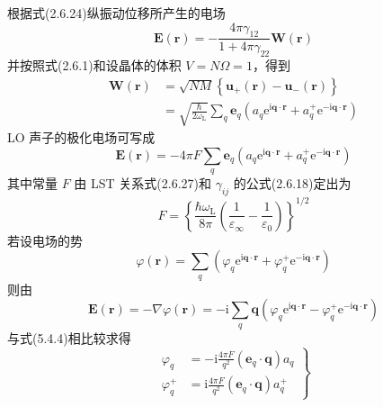 根据式(2.6.24)纵振动位移所产生的电场
\begin{equation}
  \boldsymbol{E}\left(\boldsymbol{r}\right)=-\frac{4\pi\gamma_{12}}{1+4\pi\gamma_{22}}\boldsymbol{W}\left(\boldsymbol{r}\right)
\end{equation}
并按照式(2.6.1)和设晶体的体积 $V=N\Omega=1$，得到
\begin{equation}
\begin{aligned}
  \boldsymbol{W}\left(\boldsymbol{r}\right)&=\sqrt{NM}\left\{\boldsymbol{u}_{+}\left(\boldsymbol{r}\right)
  -\boldsymbol{u}_{-}\left(\boldsymbol{r}\right)\right\}\\
  &=\sqrt{\frac{\hbar}{2\omega_{\mathrm{L}}}}\sum_{q}\boldsymbol{e}_q
  \left(a_q\mathrm{e}^{\mathrm{i}\boldsymbol{q}\cdot\boldsymbol{r}}+a_q^{+}\mathrm{e}^{-\mathrm{i}\boldsymbol{q}\cdot\boldsymbol{r}}\right)
\end{aligned}
\end{equation}
LO 声子的极化电场可写成
\begin{equation}
  \boldsymbol{E}\left(\boldsymbol{r}\right)=-4\pi F\sum_{q}\boldsymbol{e}_q
  \left(a_q\mathrm{e}^{\mathrm{i}\boldsymbol{q}\cdot\boldsymbol{r}}+a_q^{+}\mathrm{e}^{-\mathrm{i}\boldsymbol{q}\cdot\boldsymbol{r}}\right)
\end{equation}
其中常量 $F$ 由 LST 关系式(2.6.27)和 $\gamma_{ij}$ 的公式(2.6.18)定出为
\begin{equation}
  F=\left\{\frac{\hbar\omega_{\mathrm{L}}}{8\pi}\left(\frac{1}{\varepsilon_{\infty}}-\frac{1}{\varepsilon_0}\right)\right\}^{1/2}
\end{equation}
若设电场的势
\begin{equation}
  \varphi\left(\boldsymbol{r}\right)=\sum_{q}\left(\varphi_q\mathrm{e}^{\mathrm{i}\boldsymbol{q}\cdot\boldsymbol{r}}
  +\varphi_q^{+}\mathrm{e}^{-\mathrm{i}\boldsymbol{q}\cdot\boldsymbol{r}}\right)
\end{equation}
则由
\begin{equation}
  \boldsymbol{E}\left(\boldsymbol{r}\right)=-\nabla\varphi\left(\boldsymbol{r}\right)
  =-\mathrm{i}\sum_{q}\boldsymbol{q}\left(\varphi_q\mathrm{e}^{\mathrm{i}\boldsymbol{q}\cdot\boldsymbol{r}}
  -\varphi_q^{+}\mathrm{e}^{-\mathrm{i}\boldsymbol{q}\cdot\boldsymbol{r}}\right)
\end{equation}
与式(5.4.4)相比较求得
\begin{equation}
  \left.\begin{aligned}
  \varphi_q&=-\mathrm{i}\frac{4\pi F}{q^2}\left(\boldsymbol{e}_q\cdot\boldsymbol{q}\right)a_q\\
  \varphi_q^{+}&=\mathrm{i}\frac{4\pi F}{q^2}\left(\boldsymbol{e}_q\cdot\boldsymbol{q}\right)a_q^{+}
  \end{aligned}\right\}
\end{equation}
